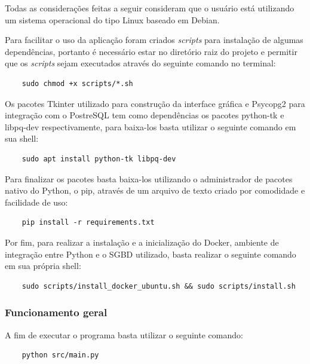 Todas as considerações feitas a seguir consideram que o usuário está utilizando um sistema operacional do tipo Linux baseado em Debian.

Para facilitar o uso da aplicação foram criados \textit{scripts} para instalação de algumas dependências, portanto é necessário estar no diretório raiz do projeto e permitir que os \textit{scripts} sejam executados através do seguinte comando no terminal:


\begin{lstlisting}
    sudo chmod +x scripts/*.sh
\end{lstlisting}

Os pacotes Tkinter utilizado para construção da interface gráfica e Psycopg2 para integração com o PostreSQL tem como dependências os pacotes python-tk e libpq-dev respectivamente, para baixa-los basta utilizar o seguinte comando em sua shell:

\begin{lstlisting}
    sudo apt install python-tk libpq-dev
\end{lstlisting}

Para finalizar os pacotes basta baixa-los utilizando o administrador de pacotes nativo do Python, o pip, através de um arquivo de texto criado por comodidade e facilidade de uso:

\begin{lstlisting}
    pip install -r requirements.txt
\end{lstlisting}

Por fim, para realizar a instalação e a inicialização do Docker, ambiente de integração entre Python e o SGBD utilizado, basta realizar o seguinte comando em sua própria shell:

\begin{lstlisting}
    sudo scripts/install_docker_ubuntu.sh && sudo scripts/install.sh
\end{lstlisting}
\subsubsection{Funcionamento geral}
A fim de executar o programa basta utilizar o seguinte comando:

\begin{lstlisting}
    python src/main.py
\end{lstlisting}


